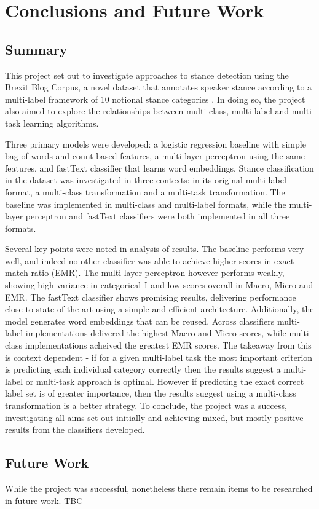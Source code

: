 \documentclass[Dissertation.tex]{subfiles}
\begin{document}
\chapter{Conclusions and Future Work}
\section{Summary}
This project set out to investigate approaches to stance detection using the Brexit Blog Corpus, a novel dataset that annotates speaker stance according to a multi-label framework of 10 notional stance categories \cite{simakiAnnotatingSpeakerStance2017}. In doing so, the project also aimed to explore the relationships between multi-class, multi-label and multi-task learning algorithms. 

Three primary models were developed: a logistic regression baseline with simple bag-of-words and count based features,  a multi-layer perceptron using the same features, and fastText classifier that learns word embeddings. Stance classification in the dataset was investigated in three contexts: in its original multi-label format, a multi-class transformation and a multi-task transformation. The baseline was implemented in multi-class and multi-label formats, while the multi-layer perceptron and fastText classifiers were both implemented in all three formats.

Several key points were noted in analysis of results. The baseline performs very well, and indeed no other classifier was able to achieve higher scores in exact match ratio (EMR). The multi-layer perceptron however performs weakly, showing high variance in categorical \f{1} and low scores overall in \f{Macro}, \f{Micro} and EMR. The fastText classifier shows promising results, delivering performance close to state of the art using a simple and efficient architecture. Additionally, the model generates word embeddings that can be reused.  Across classifiers multi-label implementations delivered the highest \f{Macro} and \f{Micro} scores, while multi-class implementations acheived the greatest EMR scores. The takeaway from this is context dependent - if for a given multi-label task the most important criterion is predicting each individual category correctly then the results suggest a multi-label or multi-task approach is optimal. However if predicting the exact correct label set is of greater importance, then the results suggest using a multi-class transformation is a better strategy. To conclude, the project was a success, investigating all aims set out initially and achieving mixed, but mostly positive results from the classifiers developed. 

\section{Future Work}
While the project was successful, nonetheless there remain items to be researched in future work. TBC
\end{document}
